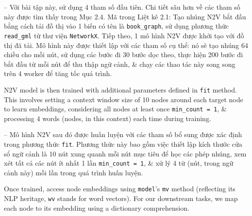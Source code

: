 \documentclass{article}
\begin{document}
\begin{itemize}
\begin{itemize}
\begin{itemize}
           -- Với bài tập này, sử dụng 4 tham số đầu tiên. Chi tiết sâu hơn về các tham số này được tìm thấy trong Mục 2.4. Mã trong {\sf Liệt kê 2.1: Tạo nhúng N2V} bắt đầu bằng cách tải đồ thị vào 1 biến có tên là \verb|book_graph|, sử dụng phương thức \verb|read_gml| từ thư viện {\tt NetworkX}. Tiếp theo, 1 mô hình N2V {\tt} được khởi tạo với đồ thị đã tải. Mô hình này được thiết lập với các tham số cụ thể: nó sẽ tạo nhúng 64 chiều cho mỗi nút, sử dụng các bước đi 30 bước dọc theo, thực hiện 200 bước đi bắt đầu từ mỗi nút để thu thập ngữ cảnh, \& chạy các thao tác này song song trên 4 worker để tăng tốc quá trình.

           N2V model is then trained with additional parameters defined in {\tt fit} method. This involves setting a context window size of 10 nodes around each target node to learn embeddings, considering all nodes at least once \verb|min_count = 1|, \& processing 4 words (nodes, in this context) each time during training.

           -- Mô hình N2V sau đó được huấn luyện với các tham số bổ sung được xác định trong phương thức {\tt fit}. Phương thức này bao gồm việc thiết lập kích thước cửa sổ ngữ cảnh là 10 nút xung quanh mỗi nút mục tiêu để học các phép nhúng, xem xét tất cả các nút ít nhất 1 lần \verb|min_count = 1|, \& xử lý 4 từ (nút, trong ngữ cảnh này) mỗi lần trong quá trình huấn luyện.

           Once trained, access node embeddings using {\tt model}'s {\tt mv} method (reflecting its NLP heritage, {\tt wv} stands for word vectors). For our downstream tasks, we map each node to its embedding using a dictionary comprehension.


\end{itemize}
\end{itemize}
\end{itemize}
\end{document}
